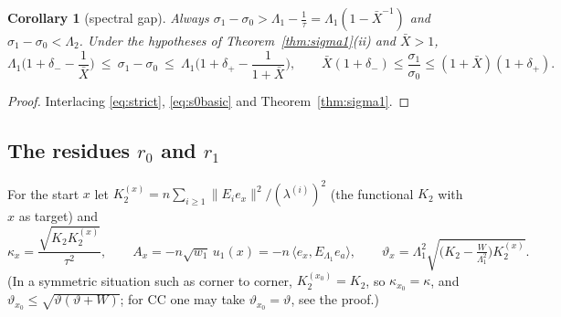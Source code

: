 \documentclass[11pt,a4paper]{article}
\newcommand{\ip}[2]{\langle #1,#2\rangle}
\newcommand{\Xb}{\bar X}
\theoremstyle{plain}
\newtheorem{corollary}[theorem]{Corollary}
\theoremstyle{definition}
\numberwithin{equation}{section}
\begin{document}
\begin{corollary}[spectral gap]\label{cor:gap}
Always $\sigma_1-\sigma_0>\Lambda_1-\frac1\tau=\Lambda_1(1-\Xb^{-1})$ and $\sigma_1-\sigma_0<\Lambda_2$. Under the hypotheses of Theorem~\ref{thm:sigma1}(ii) and $\Xb>1$,
\[
\Lambda_1\Big(1+\delta_--\frac{1}{\Xb}\Big)\ \le\ \sigma_1-\sigma_0\ \le\ \Lambda_1\Big(1+\delta_+-\frac{1}{1+\Xb}\Big),\qquad
\Xb(1+\delta_-)\le\frac{\sigma_1}{\sigma_0}\le(1+\Xb)(1+\delta_+).
\]
\end{corollary}
\begin{proof}
Interlacing \eqref{eq:strict}, \eqref{eq:s0basic} and Theorem~\ref{thm:sigma1}.
\end{proof}

\subsection{The residues $r_0$ and $r_1$}
For the start $x$ let $K_2^{(x)}=n\sum_{i\ge1}\|E_ie_x\|^2/(\lambda^{(i)})^2$ (the functional $K_2$ with $x$ as target) and
\[
\kappa_x=\frac{\sqrt{K_2K_2^{(x)}}}{\tau^2},\qquad A_x=-n\sqrt{w_1}\,u_1(x)=-n\,\ip{e_x}{E_{\Lambda_1}e_a},\qquad
\vartheta_x=\Lambda_1^2\sqrt{\big(K_2-\tfrac{W}{\Lambda_1^2}\big)K_2^{(x)}} .
\]
(In a symmetric situation such as corner to corner, $K_2^{(x_0)}=K_2$, so $\kappa_{x_0}=\kappa$, and $\vartheta_{x_0}\le\sqrt{\vartheta(\vartheta+W)}$; for CC one may take $\vartheta_{x_0}=\vartheta$, see the proof.)
\end{document}
